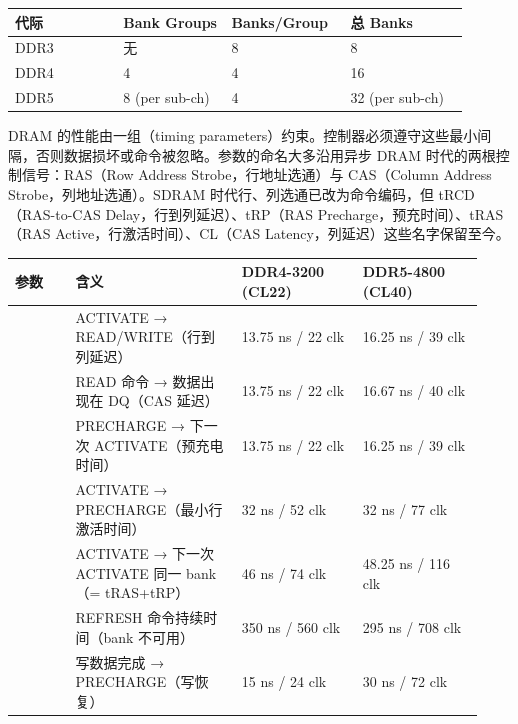 \begin{longtable}{L{0.22\linewidth}L{0.22\linewidth}L{0.22\linewidth}L{0.24\linewidth}}
\toprule
代际 & Bank Groups & Banks/Group & 总 Banks \\
\midrule
DDR3 & 无 & 8 & 8 \\\tablerowrule
DDR4 & 4 & 4 & 16 \\\tablerowrule
DDR5 & 8 (per sub-ch) & 4 & 32 (per sub-ch) \\
\bottomrule
\end{longtable}


DRAM 的性能由一组（timing parameters）约束。控制器必须遵守这些最小间隔，否则数据损坏或命令被忽略。参数的命名大多沿用异步 DRAM 时代的两根控制信号：RAS（Row Address Strobe，行地址选通）与 CAS（Column Address Strobe，列地址选通）。SDRAM 时代行、列选通已改为命令编码，但 tRCD（RAS-to-CAS Delay，行到列延迟）、tRP（RAS Precharge，预充时间）、tRAS（RAS Active，行激活时间）、CL（CAS Latency，列延迟）这些名字保留至今。

\begin{longtable}{L{0.12\linewidth}L{0.33\linewidth}L{0.24\linewidth}L{0.24\linewidth}}
\toprule
参数 & 含义 & DDR4-3200 (CL22) & DDR5-4800 (CL40) \\
\midrule
{} & ACTIVATE → READ/WRITE（行到列延迟） & 13.75 ns / 22 clk & 16.25 ns / 39 clk \\\tablerowrule
{} & READ 命令 → 数据出现在 DQ（CAS 延迟） & 13.75 ns / 22 clk & 16.67 ns / 40 clk \\\tablerowrule
{} & PRECHARGE → 下一次 ACTIVATE（预充电时间） & 13.75 ns / 22 clk & 16.25 ns / 39 clk \\\tablerowrule
{} & ACTIVATE → PRECHARGE（最小行激活时间） & 32 ns / 52 clk & 32 ns / 77 clk \\\tablerowrule
{} & ACTIVATE → 下一次 ACTIVATE 同一 bank（= tRAS+tRP） & 46 ns / 74 clk & 48.25 ns / 116 clk \\\tablerowrule
{} & REFRESH 命令持续时间（bank 不可用） & 350 ns / 560 clk & 295 ns / 708 clk \\\tablerowrule
{} & 写数据完成 → PRECHARGE（写恢复） & 15 ns / 24 clk & 30 ns / 72 clk \\
\bottomrule
\end{longtable}

